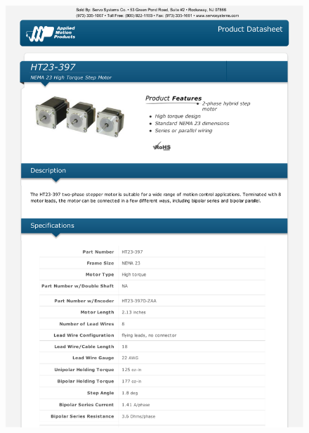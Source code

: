 \begin{figure}[h]   
\begin{centering}
\includegraphics[width=0.8\columnwidth]{datasheets/ht23-397.pdf}
\par\end{centering}

\end{figure}

